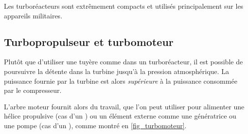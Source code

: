 		Les turboréacteurs sont extrêmement compacts et utilisés principalement sur les appareils militaires.

		 

	\subsection{Turbopropulseur et turbomoteur}
	\label{ch_turboprop_turboshaft}

		Plutôt que d’utiliser une tuyère comme dans un turboréacteur, il est possible de poursuivre la détente dans la turbine jusqu’à la pression atmosphérique. La puissance fournie par la turbine est alors \emph{supérieure} à la puissance consommée par le compresseur. 

		L’arbre moteur fournit alors du travail, que l’on peut utiliser pour alimenter une hélice propulsive (cas d’un ) ou un élément externe comme une génératrice ou une pompe (cas d’un ), comme montré en \cref{fig_turbomoteur}.

